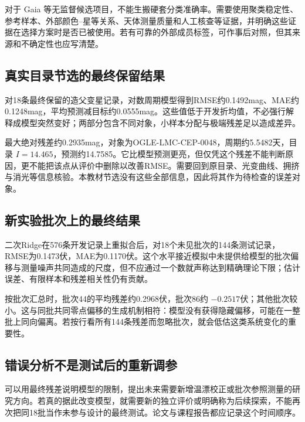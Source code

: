 对于 Gaia 等无监督候选项目，不能生搬硬套分类准确率。需要使用聚类稳定性、参考样本、外部颜色--星等关系、天体测量质量和人工核查等证据，并明确这些证据在选择方案时是否已被使用。若有可靠的外部成员标签，可作事后对照，但其来源和不确定性也应写清楚。

\subsection{真实目录节选的最终保留结果}
对18条最终保留的造父变星记录，对数周期模型得到RMSE约0.1492mag、MAE约0.1248mag，平均预测减目标约0.0555mag。这些值低于开发折均值，不必强行解释成模型突然变好；两部分包含不同对象，小样本分配与极端残差足以造成差异。


最大绝对残差约0.2935mag，对象为OGLE-LMC-CEP-0048，周期约5.5482天，目录 $I=14.465$，预测约14.7585。它比模型预测更亮，但仅凭这个残差不能判断原因，更不能把该点从评价中删除以改善RMSE。需要回到原目录、光变曲线、拥挤与消光等信息核验。本教材节选没有这些全部信息，因此将其作为待检查的误差对象。

\subsection{新实验批次上的最终结果}
二次Ridge在576条开发记录上重拟合后，对18个未见批次的144条测试记录，RMSE为0.1473伏，MAE为0.1170伏。这个水平接近模拟中未提供给模型的批次偏移与测量噪声共同造成的尺度，但不应通过一个数就声称达到精确理论下限；估计误差、有限样本和残差相关性仍有贡献。


按批次汇总时，批次44的平均残差约0.2968伏，批次86约 $-0.2517$伏；其他批次较小。这与同批共同零点偏移的生成机制相符：模型没有获得隐藏偏移，可能在一整批上同向偏离。若按行看所有144条残差而忽略批次，就会低估这类系统变化的重要性。

\subsection{错误分析不是测试后的重新调参}
可以用最终残差说明模型的限制，提出未来需要新增温漂校正或批次参照测量的研究方向。若真的据此改变模型，就需要新的独立评价或明确称为后续探索，不能再次把同18批当作未参与设计的最终测试。论文与课程报告都应记录这个时间顺序。

